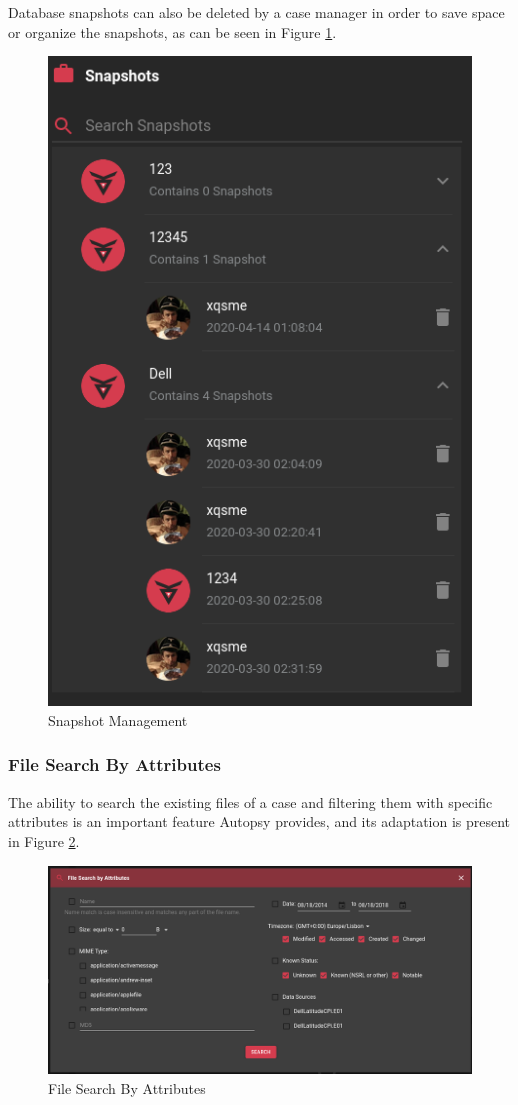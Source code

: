 Database snapshots can also be deleted by a case manager in order to save space or organize the snapshots, as can be seen in Figure \ref{fig:snapshotmanage}.

\begin{figure}[ht]
 \centering
 \includegraphics[width=0.35\linewidth]{imgs/snapshotmanage.png}
 \caption{Snapshot Management}
 \label{fig:snapshotmanage}
\end{figure}

\subsubsection*{File Search By Attributes}

The ability to search the existing files of a case and filtering them with specific attributes is an important feature Autopsy provides, and its adaptation is present in Figure \ref{fig:search}.

\begin{figure}[ht]
 \centering
 \includegraphics[width=\linewidth]{imgs/search.png}
 \caption{File Search By Attributes}
 \label{fig:search}
\end{figure}

\bigskip

